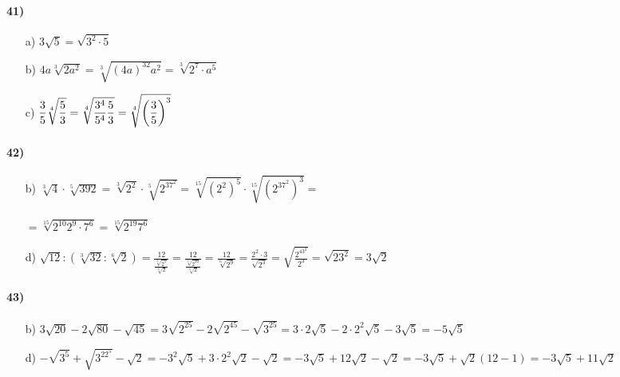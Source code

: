 \documentclass[palatino,nosec,nochap]{Docencia}
\begin{document}
\paragraph{41)}
\begin{itemize}
	\item[a)] $\displaystyle3\sqrt{5} = \sqrt{3^2·5}$
	\item[b)] $\displaystyle4a\sqrt[3]{2a^2} = \sqrt[3]{(4a)^32a^2} = \sqrt[3]{2^7·a^5}$
	\item[c)] $\displaystyle\displaystyle\frac{3}{5}\sqrt[4]{\frac{5}{3}} = \sqrt[4]{\frac{3^4}{5^4}\frac{5}{3}} = \sqrt[4]{\left(\frac{3}{5}\right)^3}$
\end{itemize}

\paragraph{42)}
\begin{itemize}
	\item[b)] $\displaystyle\sqrt[3]{4}·\sqrt[5]{392} = \sqrt[3]{2^2}·\sqrt[5]{2^37^2} = \sqrt[15]{(2^2)^5}·\sqrt[15]{(2^37^2)^3} =$\\\\$
	 =\sqrt[15]{2^{10}2^9·7^6} = \sqrt[15]{2^{19}7^6}$
	\item[d)] $\displaystyle\sqrt{12}:(\sqrt[3]{32}:\sqrt[6]{2}) = \displaystyle\frac{12}{\frac{\sqrt[3]{2^5}}{\sqrt[6]{2}}} =  \displaystyle\frac{12}{\frac{\sqrt[6]{2^{10}}}{\sqrt[6]{2}}} = \displaystyle\frac{12}{\sqrt[6]{2^{9}}} = \frac{2^2·3}{\sqrt{2^3}} = \sqrt{\frac{2^43^2}{2^3}} = \sqrt{23^2} = 3\sqrt{2}$
\end{itemize}

\paragraph{43)}
\begin{itemize}
	\item[b)] $\displaystyle3\sqrt{20}-2\sqrt{80}-\sqrt{45} = 3\sqrt{2^25}-2\sqrt{2^45}-\sqrt{3^25} = 3·2\sqrt{5}-2·2^2\sqrt{5}-3\sqrt{5} = -5\sqrt{5}$
	\item[d)] $\displaystyle-\sqrt{3^5}+\sqrt{3^22^5}-\sqrt{2} = -3^2\sqrt{5} + 3·2^2\sqrt{2} - \sqrt{2} = -3\sqrt{5}+12\sqrt{2}-\sqrt{2} = -3\sqrt{5}+\sqrt{2}(12-1) = -3\sqrt{5}+11\sqrt{2}$
\end{itemize}

\printindex
\end{document}
